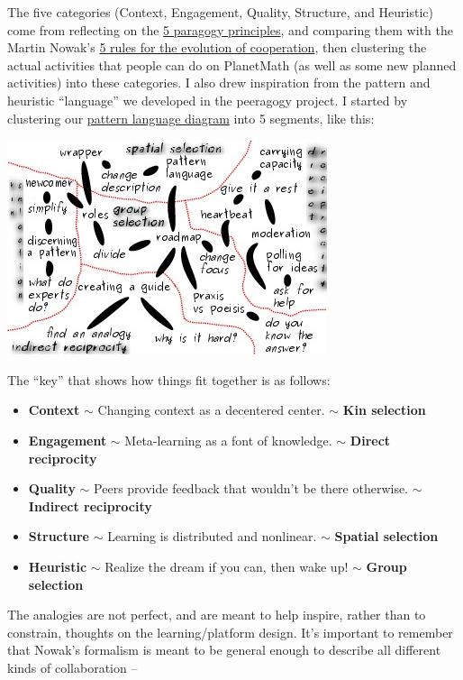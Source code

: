 The five categories (Context, Engagement, Quality, Structure, and
Heuristic) come from reflecting on the \href{http://paragogy.net}{5
paragogy principles}, and comparing them with the Martin Nowak's
\href{http://www.sciencemag.org/content/314/5805/1560.full}{5 rules for
the evolution of cooperation}, then clustering the actual activities
that people can do on PlanetMath (as well as some new planned
activities) into these categories. I also drew inspiration from the
pattern and heuristic ``language'' we developed in the peeragogy
project. I started by clustering our
\href{http://peeragogy.org/patterns-usecases/patterns-and-heuristics/}{pattern
language diagram} into 5 segments, like this:

\begin{center}
\includegraphics[width=.9\textwidth]{../pictures/subway-redline.jpg} 
\end{center}

The ``key'' that shows how things fit together is as follows:

\begin{itemize}
\item
  \textbf{Context} \ensuremath{\sim} Changing context as a decentered
  center. \ensuremath{\sim} \textbf{Kin selection}
\item
  \textbf{Engagement} \ensuremath{\sim} Meta-learning as a font of
  knowledge. \ensuremath{\sim} \textbf{Direct reciprocity}
\item
  \textbf{Quality} \ensuremath{\sim} Peers provide feedback that
  wouldn't be there otherwise. \ensuremath{\sim} \textbf{Indirect
  reciprocity}
\item
  \textbf{Structure} \ensuremath{\sim} Learning is distributed and
  nonlinear. \ensuremath{\sim} \textbf{Spatial selection}
\item
  \textbf{Heuristic} \ensuremath{\sim} Realize the dream if you can,
  then wake up! \ensuremath{\sim} \textbf{Group selection}
\end{itemize}
The analogies are not perfect, and are meant to help inspire, rather
than to constrain, thoughts on the learning/platform design. It's
important to remember that Nowak's formalism is meant to be general
enough to describe all different kinds of collaboration --

